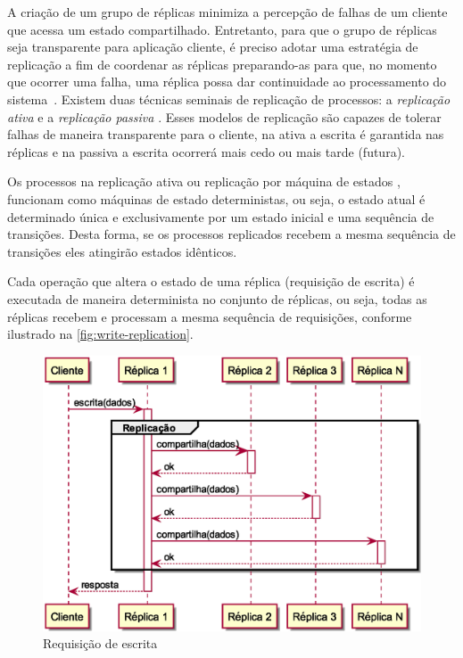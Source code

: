 A criação de um grupo de réplicas minimiza a percepção de falhas de um cliente que acessa
um estado compartilhado. Entretanto, para que o grupo de réplicas seja transparente para
aplicação cliente, é preciso adotar uma estratégia de replicação a fim de coordenar as
réplicas preparando-as para que, no momento que ocorrer uma falha, uma réplica possa dar
continuidade ao processamento do sistema~\cite{jalote94}. Existem duas técnicas seminais
de replicação de processos: a \emph{replicação ativa} e a \emph{replicação passiva}
\cite{jalote94}. Esses modelos de replicação são capazes de tolerar falhas de maneira
transparente para o cliente, na ativa a escrita é garantida nas réplicas e na passiva a
escrita ocorrerá mais cedo ou mais tarde (futura).

Os processos na replicação ativa \cite{coulouris11, guerraoui97} ou replicação por máquina
de estados \cite{schneider90}, funcionam como máquinas de estado deterministas, ou seja, o
estado atual é determinado única e exclusivamente por um estado inicial e uma sequência de
transições. Desta forma, se os processos replicados recebem a mesma sequência de
transições eles atingirão estados idênticos.

Cada operação que altera o estado de uma réplica (requisição de escrita) é executada de
maneira determinista no conjunto de réplicas, ou seja, todas as réplicas recebem e
processam a mesma sequência de requisições, conforme ilustrado na
\autoref{fig:write-replication}.

\begin{figure}[htbp]
  \centering
  \includegraphics[width=12cm]{conteudo/capitulos/figuras/escrita.eps}
  \caption{Requisição de escrita}
  \label{fig:write-replication}
\end{figure}


